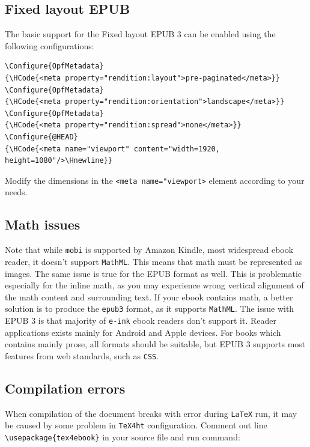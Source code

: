 \subsection{Fixed layout EPUB}\label{fixed-layout-epub}

The basic support for the Fixed layout EPUB 3 can be enabled using the
following configurations:

\begin{verbatim}
\Configure{OpfMetadata}
{\HCode{<meta property="rendition:layout">pre-paginated</meta>}}
\Configure{OpfMetadata}
{\HCode{<meta property="rendition:orientation">landscape</meta>}}
\Configure{OpfMetadata}
{\HCode{<meta property="rendition:spread">none</meta>}}
\Configure{@HEAD}
{\HCode{<meta name="viewport" content="width=1920, height=1080"/>\Hnewline}}
\end{verbatim}

Modify the dimensions in the
\texttt{\textless{}meta\ name="viewport\textgreater{}} element according
to your needs.

\subsection{Math issues}\label{math-issues}

Note that while \texttt{mobi} is supported by Amazon Kindle, most
widespread ebook reader, it doesn't support \texttt{MathML}. This means
that math must be represented as images. The same issue is true for the
EPUB format as well. This is problematic especially for the inline math,
as you may experience wrong vertical alignment of the math content and
surrounding text. If your ebook contains math, a better solution is to
produce the \texttt{epub3} format, as it supports \texttt{MathML}. The
issue with EPUB 3 is that majority of \texttt{e-ink} ebook readers don't
support it. Reader applications exists mainly for Android and Apple
devices. For books which contains mainly prose, all formats should be
suitable, but EPUB 3 supports most features from web standards, such as
\texttt{CSS}.

\subsection{Compilation errors}\label{compilation-errors}

When compilation of the document breaks with error during \texttt{LaTeX}
run, it may be caused by some problem in \texttt{TeX4ht} configuration.
Comment out line \texttt{\textbackslash{}usepackage\{tex4ebook\}} in
your source file and run command:

